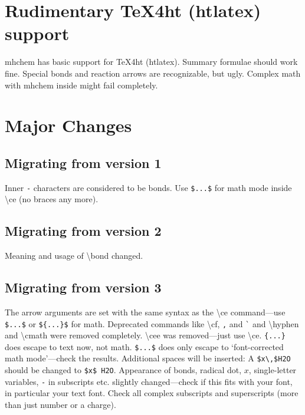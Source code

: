 \documentclass[a4paper,notitlepage,parskip=half]{scrreprt}
\newcommand\macro[1]{\mbox{\ttfamily\textbackslash#1}}
\begin{document}
\begin{SideBySideExample}[xrightmargin=3cm]
\end{SideBySideExample}

\begin{SideBySideExample}[xrightmargin=3cm]
\end{SideBySideExample}



\section{Rudimentary \TeX 4ht (htlatex) support}

mhchem has basic support for \TeX 4ht (htlatex). Summary formulae should work fine. Special bonds and reaction arrows are recognizable, but ugly. Complex math with mhchem inside might fail completely.

\clearpage
\section{Major Changes}
\label{sec:WhatSNew}

\subsection{Migrating from version 1}

Inner \verb|-| characters are considered to be bonds. Use \verb|$...$| for math mode inside \macro{ce} (no braces any more).

\subsection{Migrating from version 2}

Meaning and usage of \macro{bond} changed.

\subsection{Migrating from version 3}

The arrow arguments are set with the same syntax as the \macro{ce} command---use \verb|$...$| or \verb|${...}$| for math.
Deprecated commands like \macro{cf}, \verb|,| and \verb|`| and \macro{hyphen} and \macro{cmath} were removed completely. \macro{cee} was removed---just use \macro{ce}.
\verb|{...}| does escape to text now, not math.
\verb|$...$| does only escape to `font-corrected math mode'---check the results.
Additional spaces will be inserted: A \verb|$x\,$H2O| should be changed to \verb|$x$ H2O|.
Appearance of bonds, radical dot, $x$, single-letter variables, \verb|-| in subscripts etc. slightly changed---check if this fits with your font, in particular your text font.
Check all complex subscripts and superscripts (more than just number or a charge).
\end{document}
